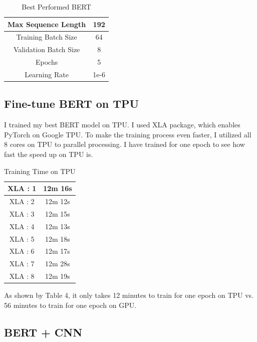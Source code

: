 \documentclass[11pt,a4paper]{article}
\begin{document}
\begin{table}[!htbp]
	\centering
	\begin{tabular}{|c|c|}
		\hline
		{Max Sequence Length}   & 192  \\ \hline
		{Training Batch Size}   & 64   \\ \hline
		{Validation Batch Size} & 8    \\ \hline
		{Epochs}                & 5    \\ \hline
		{Learning Rate}         & 1e-6 \\ \hline
	\end{tabular}
	\caption{\label{table:my-label} Best Performed BERT}
\end{table}


\subsection{Fine-tune BERT on TPU}

I trained my best BERT model on TPU. I used XLA package, which enables PyTorch on Google TPU. To make the training process even faster, I utilized all 8 cores on TPU to parallel processing. I have trained for one epoch to see how fast the speed up on TPU is.\\

\begin{table}[!htbp]
	\centering
	\begin{tabular}{|c|c|}
		\hline
		{XLA : 1} & 12m 16s \\ \hline
		{XLA : 2} & 12m 12s \\ \hline
		{XLA : 3} & 12m 15s \\ \hline
		{XLA : 4} & 12m 13s \\ \hline
		{XLA : 5} & 12m 18s \\ \hline
		{XLA : 6} & 12m 17s \\ \hline
		{XLA : 7} & 12m 28s \\ \hline
		{XLA : 8} & 12m 19s \\ \hline
	\end{tabular}
	\caption{\label{table:my-label} Training Time on TPU}
\end{table}

\noindent As shown by Table 4, it only takes 12 minutes to train for one epoch on TPU vs. 56 minutes to train for one epoch on GPU.\\

\subsection{BERT + CNN}
\end{document}
